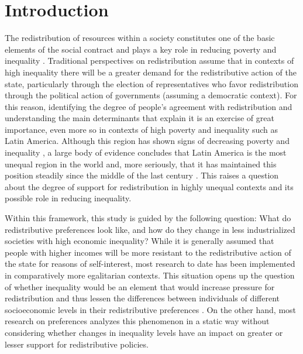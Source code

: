 \documentclass[utf8]{frontiersSCNS} %
\begin{document}
\section{Introduction}

The redistribution of resources within a society constitutes one of the basic elements of the social contract and plays a key role in reducing poverty and inequality \parencite{HoffmanLopsidedContinentInequality2003}. Traditional perspectives on redistribution assume that in contexts of high inequality there will be a greater demand for the redistributive action of the state, particularly through the election of representatives who favor redistribution through the political action of governments (assuming a democratic context). For this reason, identifying the degree of people’s agreement with redistribution and understanding the main determinants that explain it is an exercise of great importance, even more so in contexts of high poverty and inequality such as Latin America. Although this region has shown signs of decreasing poverty and inequality \parencite{LustigDecliningInequalityLatin2013, Dayton-Johnson2015}, a large body of evidence concludes that Latin America is the most unequal region in the world \parencite{Bertola2009, WilliamsonLatinAmericanInequality2015, CEPALPanoramaSocialAmerica2016} and, more seriously, that it has maintained this position steadily since the middle of the last century \parencite{MannExplainingmacroregionaltrends2007}. This raises a question about the degree of support for redistribution in highly unequal contexts and its possible role in reducing inequality.

Within this framework, this study is guided by the following question: What do redistributive preferences look like, and how do they change in less industrialized societies with high economic inequality? While it is generally assumed that people with higher incomes will be more resistant to the redistributive action of the state for reasons of self-interest, most research to date has been implemented in comparatively more egalitarian contexts. This situation opens up the question of whether inequality would be an element that would increase pressure for redistribution and thus lessen the differences between individuals of different socioeconomic levels in their redistributive preferences \parencite{Dimick2016,Dimick2018}. On the other hand, most research on preferences analyzes this phenomenon in a static way without considering whether changes in inequality levels have an impact on greater or lesser support for redistributive policies.
\end{document}
